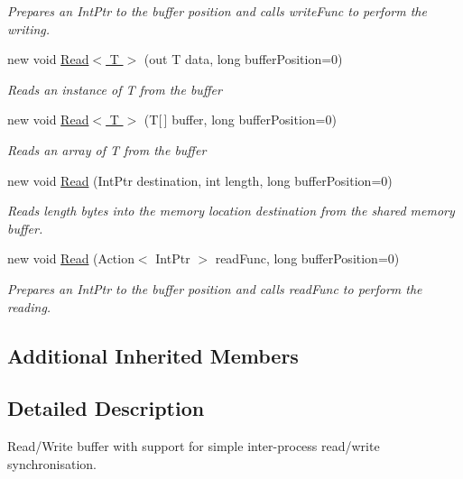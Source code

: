 \begin{DoxyCompactItemize}
\begin{DoxyCompactList}\small\item\em Prepares an Int\+Ptr to the buffer position and calls {\itshape write\+Func}  to perform the writing. \end{DoxyCompactList}\item 
new void \hyperlink{class_shared_memory_1_1_buffer_read_write_a4fc92192136290cea195db4ee573843e}{Read$<$ T $>$} (out T data, long buffer\+Position=0)
\begin{DoxyCompactList}\small\item\em Reads an instance of {\itshape T}  from the buffer \end{DoxyCompactList}\item 
new void \hyperlink{class_shared_memory_1_1_buffer_read_write_a3c49b75b3b06a22c73bfd26c90d220d6}{Read$<$ T $>$} (T\mbox{[}$\,$\mbox{]} buffer, long buffer\+Position=0)
\begin{DoxyCompactList}\small\item\em Reads an array of {\itshape T}  from the buffer \end{DoxyCompactList}\item 
new void \hyperlink{class_shared_memory_1_1_buffer_read_write_a5d187c340e0f342a2f1be07d4f9957f7}{Read} (Int\+Ptr destination, int length, long buffer\+Position=0)
\begin{DoxyCompactList}\small\item\em Reads {\itshape length}  bytes into the memory location {\itshape destination}  from the shared memory buffer. \end{DoxyCompactList}\item 
new void \hyperlink{class_shared_memory_1_1_buffer_read_write_ad8e09d6fb5fd4f72170e768f7b84911d}{Read} (Action$<$ Int\+Ptr $>$ read\+Func, long buffer\+Position=0)
\begin{DoxyCompactList}\small\item\em Prepares an Int\+Ptr to the buffer position and calls {\itshape read\+Func}  to perform the reading. \end{DoxyCompactList}\end{DoxyCompactItemize}
\subsection*{Additional Inherited Members}


\subsection{Detailed Description}
Read/\+Write buffer with support for simple inter-\/process read/write synchronisation. 




